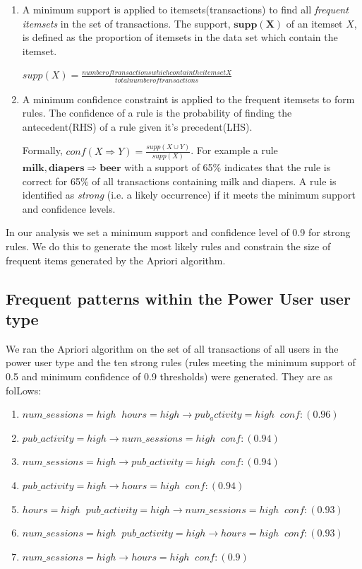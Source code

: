 \documentclass{acm_proc_article-sp}
\begin{document}
\begin{enumerate}
\item A minimum support is applied to itemsets(transactions) to find all \textit{frequent itemsets} in the set of transactions.
The support, $\mathbf{supp(X)}$ of an itemset $X$, is defined as the proportion of itemsets in the data set which contain the 
itemset.



$supp\left(X\right) = \frac{number of transactions which contain the itemset X}{total number of transactions}$



\item A minimum confidence constraint is applied to the frequent itemsets to form rules. The confidence of a rule is the probability of finding the antecedent(RHS) of a rule given it's precedent(LHS).

Formally, $conf(X \Longrightarrow Y) = \frac{supp\left(X \cup Y\right)}{supp\left(X\right)}$. 
For example a rule $\mathbf{milk,diapers \Longrightarrow {beer}}$ with a support of 65\% indicates that the rule is correct for 65\% of all transactions containing milk and diapers.
 A rule is identified as \textit{strong} (i.e. a likely occurrence) if it meets the minimum support and confidence levels.
\end{enumerate}

In our analysis we set a minimum support and confidence level of 0.9 for strong rules. We do this to generate the most likely rules and constrain the size of frequent items generated by the Apriori algorithm.

\subsection {Frequent patterns within the Power User user type}
We ran the Apriori algorithm on the set of all transactions of all users in the power user type and the ten strong rules (rules meeting the minimum support of 0.5 and minimum confidence of 0.9 thresholds) were generated. They are as folLows:

\begin{enumerate}
 \item $num\_sessions=high \;\; hours=high \longrightarrow pub_activity=high   \;\;conf:(0.96)$
 \item $pub\_activity=high \longrightarrow num\_sessions=high  \;\;  conf:(0.94)$
 \item $num\_sessions=high \longrightarrow pub\_activity=high   \;\; conf:(0.94)$
 \item $pub\_activity=high \longrightarrow hours=high  \;\;  conf:(0.94)$
 \item $hours=high \;\; pub\_activity=high \longrightarrow num\_sessions=high  \;\; conf:(0.93)$
 \item $num\_sessions=high \;\; pub\_activity=high \longrightarrow hours=high   \;\;conf:(0.93)$
 \item $num\_sessions=high  \longrightarrow hours=high \;\;  conf:(0.9)$
\end{enumerate}
\end{document}
